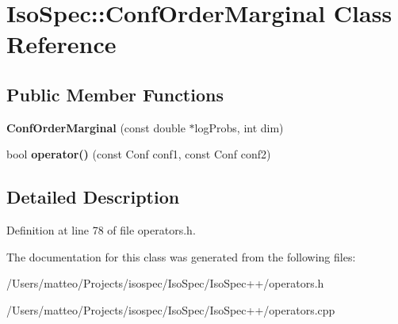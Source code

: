 \hypertarget{class_iso_spec_1_1_conf_order_marginal}{}\section{Iso\+Spec\+:\+:Conf\+Order\+Marginal Class Reference}
\label{class_iso_spec_1_1_conf_order_marginal}
\subsection*{Public Member Functions}
\begin{DoxyCompactItemize}
\item 
\mbox{\label{class_iso_spec_1_1_conf_order_marginal_a91c7b8d57bcd751f08f064802f3c8b87}} 
{\bfseries Conf\+Order\+Marginal} (const double $\ast$log\+Probs, int dim)
\item 
\mbox{\label{class_iso_spec_1_1_conf_order_marginal_a3506b5b6289592e63983b3d9143462dc}} 
bool {\bfseries operator()} (const Conf conf1, const Conf conf2)
\end{DoxyCompactItemize}


\subsection{Detailed Description}


Definition at line 78 of file operators.\+h.



The documentation for this class was generated from the following files\+:\begin{DoxyCompactItemize}
\item 
/\+Users/matteo/\+Projects/isospec/\+Iso\+Spec/\+Iso\+Spec++/operators.\+h\item 
/\+Users/matteo/\+Projects/isospec/\+Iso\+Spec/\+Iso\+Spec++/operators.\+cpp\end{DoxyCompactItemize}

